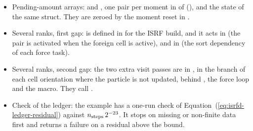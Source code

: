 \begin{itemize}
    (), with $\varphi_f$ at
     and the two pending sums at . The symmetric
    and non-symmetric force pairs route an unequal-step pair there at
     and . The active step is marked in
    : reset at the drift () and set
    by the extra ghost (), only while
     ()
    is true. It is true when the build has the extra ghost and the ISRF
    propagation is on, and, without the symmetric force interaction, only on one
    rank. A particle with a pending amount in the state of an inactive particle
    stops the run ().
    Equation~(\ref{eq:isrfd-pending-add}) is
     (), called at
    the end of the update at . The snapshot fields
    are registered at .
  \item Pending-amount arrays:  and
    , one pair per moment in
     of 
    (), and the state  of the same
    struct. They are zeroed by the moment reset in .
  \item Several ranks, first gap:  is
    defined in  for the ISRF build, and it acts in
     (the pair is activated
    when the foreign cell is active), and in
     (the sort dependency of each force task).
  \item Several ranks, second gap: the two extra visit passes are in
    , in the branch of each
    cell orientation where the particle is not updated, behind
    , the force loop and the macro. They call
    .
  \item Check of the ledger: the example  has a
    one-run check of Equation~(\ref{eq:isrfd-ledger-residual}) against
    $n_{\rm steps}\,2^{-23}$. It stops on missing or non-finite data first and
    returns a failure on a residual above the bound.
\end{itemize}

